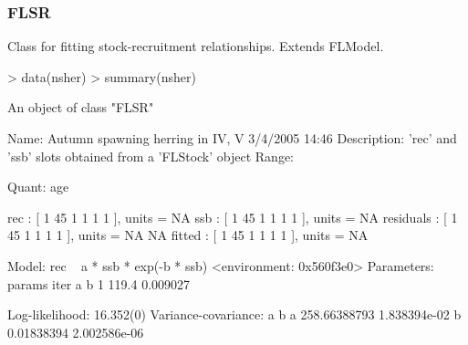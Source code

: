 \documentclass{beamer}%
\begin{document}
%
\begin{frame}[containsverbatim]
  \frametitle{FLSR}
Class for fitting stock-recruitment relationships.  Extends FLModel.
{\tiny{
\begin{Schunk}
\begin{Sinput}
> data(nsher)
> summary(nsher)
\end{Sinput}
\begin{Soutput}
An object of class "FLSR"

Name: Autumn spawning herring in IV, V  3/4/2005 14:46 
Description: 'rec' and 'ssb' slots obtained from a 'FLStock' object 
Range:	  
		
Quant: age 

rec           : [ 1 45 1 1 1 1 ], units =  NA 
ssb           : [ 1 45 1 1 1 1 ], units =  NA 
residuals     : [ 1 45 1 1 1 1 ], units =  NA NA 
fitted        : [ 1 45 1 1 1 1 ], units =  NA 

Model: 	rec ~ a * ssb * exp(-b * ssb)
<environment: 0x560f3e0>
Parameters: 
    params
iter     a        b
   1 119.4 0.009027

Log-likelihood:  16.352(0) 
Variance-covariance:    
               a            b
  a 258.66388793 1.838394e-02
  b   0.01838394 2.002586e-06
\end{Soutput}
\end{Schunk}
}}
\end{frame}
\end{document}

